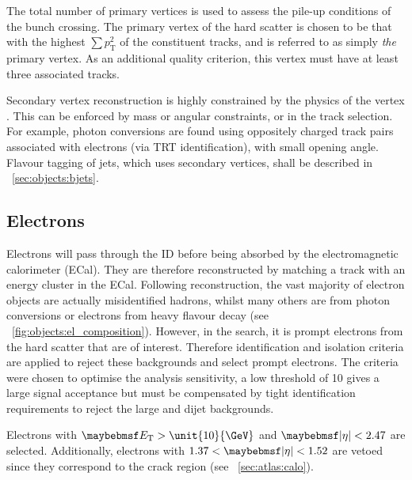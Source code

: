 The total number of primary vertices \npv is used to assess the pile-up conditions of 
the bunch crossing. The primary vertex of the hard scatter is chosen to be that with the 
highest $\sum p_{\text{T}}^2$ of the constituent tracks, and is referred to as simply 
\textit{the} primary vertex. As an additional quality criterion, this vertex must have at 
least three associated tracks.

Secondary vertex reconstruction is highly constrained by the physics of the vertex 
\cite{AllVertexFinding}. This can be enforced by mass or angular constraints, or in the 
track selection. For example, photon conversions are found using oppositely charged 
track pairs associated with electrons (via TRT identification), with small 
opening angle. Flavour tagging of jets, which uses secondary vertices, shall be described in 
\Section~\ref{sec:objects:bjets}.



\subsection{Electrons}
\label{sec:objects:electrons}

Electrons will pass through the ID before being absorbed by the electromagnetic calorimeter 
(ECal). They are therefore reconstructed by matching a track with an energy cluster in the 
ECal. Following reconstruction, the vast majority of electron objects are actually 
misidentified hadrons, 
whilst many others are from photon conversions or electrons from heavy flavour decay (see 
\Figure~\ref{fig:objects:el_composition}). However, in the \HWWlvlv search, it is prompt 
electrons from the hard scatter that are of interest. Therefore identification and 
isolation criteria are applied to reject these backgrounds and select prompt electrons. 
The criteria were chosen to optimise the analysis sensitivity, \eg a low \et threshold 
of \unit{10}{\GeV} gives a large signal acceptance but must be compensated by tight 
identification requirements to reject the large \Wjets and dijet backgrounds.

Electrons with $\et > \unit{10}{\GeV}$ and $\mods{\eta} < 2.47$ are selected. Additionally, electrons with $1.37 < \mods{\eta} < 1.52$ are vetoed since they correspond
to the crack region (see \Section~\ref{sec:atlas:calo}).

